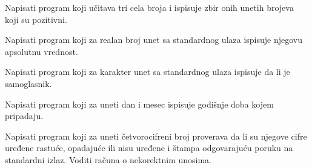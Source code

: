 \begin{Exercise}[label=v1.2_09] 
Napisati program koji učitava tri cela broja i ispisuje zbir onih unetih brojeva
koji su pozitivni.
\end{Exercise}
\begin{Answer}[ref=v1.2_09]
\end{Answer}

\begin{Exercise}[label=v1.2_10] 
Napisati program koji za realan broj unet sa standardnog ulaza
ispisuje njegovu apsolutnu vrednost.
\end{Exercise}
\begin{Answer}[ref=v1.2_10]
\end{Answer}

\begin{Exercise}[label=v1.2_11] 
Napisati program koji za karakter unet sa standardnog ulaza ispisuje
da li je samoglasnik.
\end{Exercise}
\begin{Answer}[ref=v1.2_11]
\end{Answer}

\begin{Exercise}[label=v1.2_12] 
Napisati program koji za uneti dan i mesec ispisuje godišnje doba kojem
pripadaju.  
\end{Exercise}
\begin{Answer}[ref=v1.2_12]
\end{Answer}

\begin{Exercise}[label=v1.2_13] 
Napisati program koji za uneti četvorocifreni broj proverava
da li su njegove cifre uređene rastuće, opadajuće ili nisu
uređene i štampa odgovarajuću poruku na standardni
izlaz. Voditi računa o nekorektnim unosima.
\end{Exercise}
\begin{Answer}[ref=v1.2_13]
\end{Answer}

